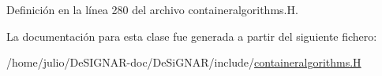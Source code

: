 Definición en la línea 280 del archivo containeralgorithms.\+H.



La documentación para esta clase fue generada a partir del siguiente fichero\+:\begin{DoxyCompactItemize}
\item 
/home/julio/\+De\+S\+I\+G\+N\+A\+R-\/doc/\+De\+Si\+G\+N\+A\+R/include/\hyperlink{containeralgorithms_8_h}{containeralgorithms.\+H}\end{DoxyCompactItemize}
